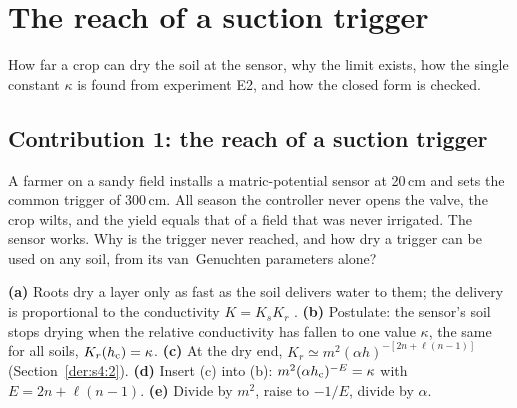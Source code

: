 \section{The reach of a suction trigger}
How far a crop can dry the soil at the sensor, why the limit exists, how the single constant $\kappa$ is found from experiment E2, and how the closed form is checked.

\subsection{Contribution 1: the reach of a suction trigger}\label{con:s4:1}
\begin{problem}
A farmer on a sandy field installs a matric-potential sensor at 20\,cm and sets the common trigger of 300\,cm. All season the controller never opens the valve, the crop wilts, and the yield equals that of a field that was never irrigated. The sensor works. Why is the trigger never reached, and how dry a trigger can be used on any soil, from its van~Genuchten parameters alone?
\end{problem}
\begin{derivation}
\textbf{(a)} Roots dry a layer only as fast as the soil delivers water to them; the delivery is proportional to the conductivity $K=K_sK_r$ \citep{Gardner1960}. \textbf{(b)} Postulate: the sensor's soil stops drying when the relative conductivity has fallen to one value $\kappa$, the same for all soils, $K_r(h_{\mathrm{c}})=\kappa$. \textbf{(c)} At the dry end, $K_r\simeq m^2(\alpha h)^{-[2n+\ell(n-1)]}$ (Section~\ref{der:s4:2}). \textbf{(d)} Insert (c) into (b): $m^2(\alpha h_{\mathrm{c}})^{-E}=\kappa$ with $E=2n+\ell(n-1)$. \textbf{(e)} Divide by $m^2$, raise to $-1/E$, divide by $\alpha$.
\end{derivation}
